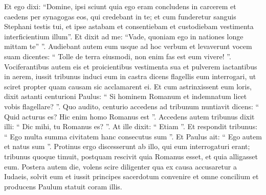 \begin{biblechapter}
\begin{biblechapter}
\begin{biblechapter}
\begin{biblechapter}
\begin{biblechapter}
\begin{biblechapter}
\begin{biblechapter}
\begin{biblechapter}
\begin{biblechapter}
\begin{biblechapter}
\begin{biblechapter}
\begin{biblechapter}
\begin{biblechapter}
\begin{biblechapter}
\begin{biblechapter}
\begin{biblechapter}
\begin{biblechapter}
\begin{biblechapter}
\begin{biblechapter}
\begin{biblechapter}
\begin{biblechapter}
\begin{biblechapter}
\verse Et ego dixi: “Domine, ipsi sciunt quia ego eram concludens in carcerem et caedens per synagogas eos, qui credebant in te; 
\verse et cum funderetur sanguis Stephani testis tui, et ipse astabam et consentiebam et custodiebam vestimenta interficientium illum”. 
\verse Et dixit ad me: “Vade, quoniam ego in nationes longe mittam te” ”.
 \verse Audiebant autem eum usque ad hoc verbum et levaverunt vocem suam dicentes: “ Tolle de terra eiusmodi, non enim fas est eum vivere! ”. 
\verse Vociferantibus autem eis et proicientibus vestimenta sua et pulverem iactantibus in aerem, 
 \verse iussit tribunus induci eum in castra dicens flagellis eum interrogari, ut sciret propter quam causam sic acclamarent ei.
 \verse Et cum astrinxissent eum loris, dixit astanti centurioni Paulus: “ Si hominem Romanum et indemnatum licet vobis flagellare? ”. 
\verse Quo audito, centurio accedens ad tribunum nuntiavit dicens: “ Quid acturus es? Hic enim homo Romanus est ”. 
\verse Accedens autem tribunus dixit illi: “ Dic mihi, tu Romanus es? ”. At ille dixit: “ Etiam ”. 
\verse Et respondit tribunus: “ Ego multa summa civitatem hanc consecutus sum ”. Et Paulus ait: “ Ego autem et natus sum ”. 
 \verse Protinus ergo discesserunt ab illo, qui eum interrogaturi erant; tribunus quoque timuit, postquam rescivit quia Romanus esset, et quia alligasset eum.
 \verse Postera autem die, volens scire diligenter qua ex causa accusaretur a Iudaeis, solvit eum et iussit principes sacerdotum convenire et omne concilium et producens Paulum statuit coram illis.
 

\end{biblechapter}
\end{biblechapter}
\end{biblechapter}
\end{biblechapter}
\end{biblechapter}
\end{biblechapter}
\end{biblechapter}
\end{biblechapter}
\end{biblechapter}
\end{biblechapter}
\end{biblechapter}
\end{biblechapter}
\end{biblechapter}
\end{biblechapter}
\end{biblechapter}
\end{biblechapter}
\end{biblechapter}
\end{biblechapter}
\end{biblechapter}
\end{biblechapter}
\end{biblechapter}
\end{biblechapter}
